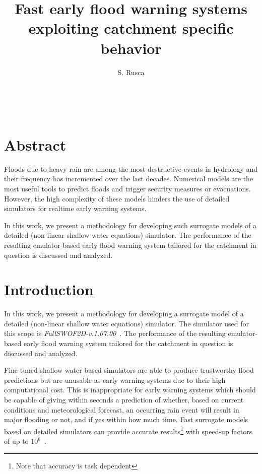 \documentclass[12pt,a4paper,english,twocolumn,fleqn]{narms}
\begin{document}
\title{Fast early flood warning systems exploiting catchment specific behavior}
\author{{S. Rusca} \\
{} \\\\
{}\\
{}
} \maketitle


\section*{Abstract}

Floods due to heavy rain are among the most destructive events in hydrology and their frequency has incremented over the last decades.
Numerical models are the most useful tools to predict floods and trigger security measures or evacuations. However, the high complexity of these models hinders the use of detailed simulators for realtime early warning systems.

In this work, we present a methodology for developing such surrogate models of a detailed (non-linear shallow water equations) simulator.
The performance of the resulting emulator-based early flood warning system tailored for the catchment in question is discussed and analyzed.

\section{Introduction}

In this work, we present a methodology for developing a surrogate model of
a detailed (non-linear shallow water equations) simulator. The simulator used
for this scope is \textit{FullSWOF\textunderscore2D-v.1.07.00}~\citep{fullswof}.
The performance of the resulting emulator-based early flood warning system tailored for the catchment in question is discussed and analyzed.

Fine tuned shallow water based simulators are able to produce trustworthy flood predictions but are unusable as early warning systems due to their high computational cost.
This is inappropriate for early warning systems which should be capable of giving within seconds a prediction of whether, based on current conditions and meteorological forecast, an occurring rain event will result in major flooding or not, and if yes within how much time.
Fast surrogate models based on detailed simulators can provide accurate results\footnote{Note that accuracy is task dependent} with speed-up factors of up to $10^6$~\citep[see][for an application in geophysical hazards]{Bayarri2015}.
\end{document}
